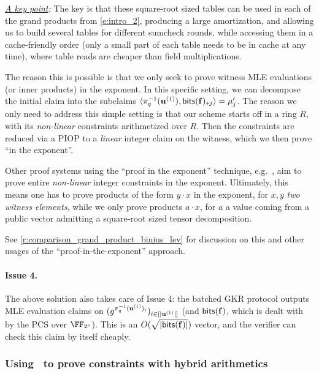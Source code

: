 \bigskip

\noindent \emph{\underline{A key point}:} The key is that these square-root sized tables can be used in each of the grand products from \eqref{e:intro_2}, producing a large amortization, and allowing us to build several tables for different sumcheck rounds, while accessing them in a cache-friendly order (only a small part of each table needs to be in cache at any time), where table reads are cheaper than field multiplications. 

The reason this is possible is that  we only seek to prove witness MLE evaluations (or inner products) in the exponent. In this specific setting, we can   decompose  the initial claim into the subclaims $\langle \pi_q^{-1}(\mathbf{u}^{(1)}), \mathsf{bits}(\mathbf{f})_{*j}\rangle = \mu_j'$. The reason we only need to address this simple setting is that our scheme starts off in a ring $R$, with its \emph{non-linear} constraints arithmetized over $R$. Then the constraints are reduced via a PIOP to a \emph{linear} integer claim on the witness,  which we then prove ``in the exponent''. 

Other proof systems using the ``proof in the exponent'' technique, e.g.\ \cite{binius64}, aim to prove entire \emph{non-linear} integer constraints in the exponent. Ultimately, this means one has to prove products of the form $y\cdot x$ in the exponent, for $x,y$ \emph{two witness elements}, while we only prove products $a\cdot x$, for $a$ a  value coming from a public vector admitting a square-root sized tensor decomposition. 

See \cref{r:comparison_grand_product_binius_lev} for discussion on this and other usages of the ``proof-in-the-exponent'' approach.




\paragraph{Issue 4.} The above solution also takes care of Issue 4: the batched GKR protocol outputs MLE evaluation claims on $(g^{\pi_q^{-1}(\mathbf{u}^{(1)})_i})_{i\in[|\mathbf{u}^{(1)}|]}$ (and $\mathsf{bits}(\mathbf{f})$, which is dealt with by the PCS over $\comfield$). This is an $O(\sqrt{|\mathsf{bits}(\mathbf{f})|})$ vector, and the verifier can check this claim by itself cheaply.


\subsubsection{Using \ftwoz\ to prove constraints with hybrid arithmetics}\label{s:intro_hybrid_proofs}


